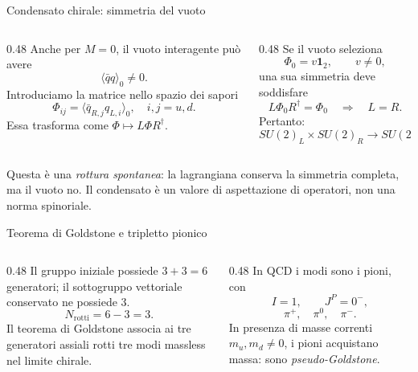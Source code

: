 \begin{frame}{Condensato chirale: simmetria del vuoto}
\small
\begin{columns}[T,onlytextwidth]
\begin{column}{0.48\textwidth}
Anche per $M=0$, il vuoto interagente può avere
\[
 \langle\bar q q\rangle_0\neq0.
\]
Introduciamo la matrice nello spazio dei sapori
\[
 \Phi_{ij}=\langle\bar q_{R,j}q_{L,i}\rangle_0,
 \quad i,j=u,d.
\]
Essa trasforma come $\Phi\mapsto L\Phi R^\dagger$.
\end{column}
\begin{column}{0.48\textwidth}
Se il vuoto seleziona
\[
 \Phi_0=v\mathbf1_2,\qquad v\neq0,
\]
una sua simmetria deve soddisfare
\[
 L\Phi_0R^\dagger=\Phi_0
 \quad\Rightarrow\quad L=R.
\]
Pertanto:
\[
 SU(2)_L\times SU(2)_R\longrightarrow SU(2)_V.
\]
\end{column}
\end{columns}
\medskip
Questa è una \emph{rottura spontanea}: la lagrangiana conserva la simmetria completa, ma il vuoto no. Il condensato è un valore di aspettazione di operatori, non una norma spinoriale.
\end{frame}

\begin{frame}{Teorema di Goldstone e tripletto pionico}
\small
\begin{columns}[T,onlytextwidth]
\begin{column}{0.48\textwidth}
Il gruppo iniziale possiede $3+3=6$ generatori; il sottogruppo vettoriale conservato ne possiede $3$.
\[
 N_{\mathrm{rotti}}=6-3=3.
\]
Il teorema di Goldstone associa ai tre generatori assiali rotti tre modi massless nel limite chirale.
\end{column}
\begin{column}{0.48\textwidth}
In QCD i modi sono i pioni, con
\[
 I=1,\qquad J^P=0^-,
\]
\[
 \pi^+,\quad\pi^0,\quad\pi^-.
\]
In presenza di masse correnti $m_u,m_d\neq0$, i pioni acquistano massa: sono \emph{pseudo-Goldstone}.
\end{column}
\end{columns}
\end{frame}

